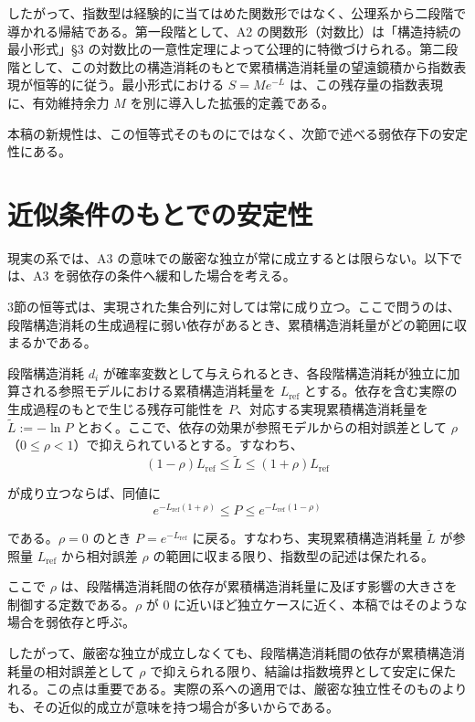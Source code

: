 \documentclass[12pt,a4paper]{article}
\begin{document}
したがって、指数型は経験的に当てはめた関数形ではなく、公理系から二段階で導かれる帰結である。第一段階として、A2 の関数形（対数比）は「構造持続の最小形式」§3 の対数比の一意性定理によって公理的に特徴づけられる。第二段階として、この対数比の構造消耗のもとで累積構造消耗量の望遠鏡積から指数表現が恒等的に従う。最小形式における \(S = M e^{-L}\) は、この残存量の指数表現に、有効維持余力 \(M\) を別に導入した拡張的定義である。

本稿の新規性は、この恒等式そのものにではなく、次節で述べる弱依存下の安定性にある。

\section{近似条件のもとでの安定性}\label{ux8fd1ux4f3cux6761ux4ef6ux306eux3082ux3068ux3067ux306eux5b89ux5b9aux6027}

現実の系では、A3 の意味での厳密な独立が常に成立するとは限らない。以下では、A3 を弱依存の条件へ緩和した場合を考える。

3節の恒等式は、実現された集合列に対しては常に成り立つ。ここで問うのは、段階構造消耗の生成過程に弱い依存があるとき、累積構造消耗量がどの範囲に収まるかである。

段階構造消耗 \(d_i\) が確率変数として与えられるとき、各段階構造消耗が独立に加算される参照モデルにおける累積構造消耗量を \(L_{\text{ref}}\) とする。依存を含む実際の生成過程のもとで生じる残存可能性を \(P\)、対応する実現累積構造消耗量を \(\tilde{L} := -\ln P\) とおく。ここで、依存の効果が参照モデルからの相対誤差として \(\rho\)（\(0 \le \rho < 1\)）で抑えられているとする。すなわち、 \[
(1-\rho)L_{\text{ref}} \le \tilde{L} \le (1+\rho)L_{\text{ref}}
\]

が成り立つならば、同値に \[
e^{-L_{\text{ref}}(1+\rho)} \le P \le e^{-L_{\text{ref}}(1-\rho)}
\]

である。\(\rho = 0\) のとき \(P = e^{-L_{\text{ref}}}\) に戻る。すなわち、実現累積構造消耗量 \(\tilde{L}\) が参照量 \(L_{\text{ref}}\) から相対誤差 \(\rho\) の範囲に収まる限り、指数型の記述は保たれる。

ここで \(\rho\) は、段階構造消耗間の依存が累積構造消耗量に及ぼす影響の大きさを制御する定数である。\(\rho\) が 0 に近いほど独立ケースに近く、本稿ではそのような場合を弱依存と呼ぶ。

したがって、厳密な独立が成立しなくても、段階構造消耗間の依存が累積構造消耗量の相対誤差として \(\rho\) で抑えられる限り、結論は指数境界として安定に保たれる。この点は重要である。実際の系への適用では、厳密な独立性そのものよりも、その近似的成立が意味を持つ場合が多いからである。
\end{document}
